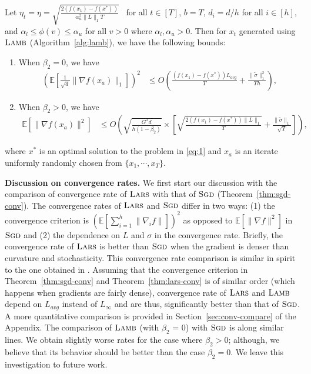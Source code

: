 \begin{theorem}
\label{thm:lamb-conv}
Let $\eta_t = \eta = \sqrt{\tfrac{2(f(x_1) - f(x^*))}{\alpha_u^2 \|L\|_1 T}}$ \ for all $t \in [T]$, $b = T$, $d_i = d/h$ for all $i \in [h]$, and $\alpha_l \leq \phi(v) \leq \alpha_u$ for all $v > 0$ where $\alpha_l, \alpha_u > 0$. Then for $x_t$ generated using $\textsc{Lamb}$ (Algorithm~\ref{alg:lamb}), we have the following bounds:
\begin{enumerate}
    \item When $\beta_2 = 0$, we have
    \begin{align*}
\left(\mathbb{E}\left[\frac{1}{\sqrt{d}}\|\nabla f(x_a)\|_1\right]\right)^2 &\leq  O\left(\frac{(f(x_1) - f(x^*))L_{avg}}{T} + \frac{\|\tilde{\sigma}\|^2_1}{Th}\right),
\end{align*}

    \item When $\beta_2 > 0$, we have
    \begin{align*}
 \mathbb{E}[\|\nabla f(x_a)\|^2] &\leq O\left(\sqrt{\frac{G^2 d}{h(1 - \beta_2)}} \times \left[\sqrt{\frac{2(f(x_1) - f(x^*))\|L\|_1}{T}} + \frac{\|\tilde{\sigma}\|_1}{\sqrt{T}} \right]\right),
\end{align*}

\end{enumerate}
where $x^*$ is an optimal solution to the problem in \eqref{eq:1} and $x_a$ is an iterate uniformly randomly chosen from $\{x_1, \cdots, x_T\}$.
\end{theorem}

{\bf Discussion on convergence rates.} We first start our discussion with the comparison of convergence rate of $\textsc{Lars}$ with that of $\textsc{Sgd}$ (Theorem~\ref{thm:sgd-conv}). The convergence rates of $\textsc{Lars}$ and $\textsc{Sgd}$ differ in two ways: (1) the convergence criterion is $(\mathbb{E}[\sum_{i=1}^h \|\nabla_i f\|])^2$ as opposed to $\mathbb{E}[\|\nabla f\|^2]$ in $\textsc{Sgd}$ and (2) the dependence on $L$ and $\sigma$ in the convergence rate. Briefly, the convergence rate of $\textsc{Lars}$ is better than $\textsc{Sgd}$ when the gradient is denser than curvature and stochasticity. This convergence rate comparison is similar in spirit to the one obtained in \citep{signsgd}. Assuming that the convergence criterion in Theorem~\ref{thm:sgd-conv} and Theorem~\ref{thm:lars-conv} is of similar order (which happens when gradients are fairly dense), convergence rate of $\textsc{Lars}$ and $\textsc{Lamb}$ depend on $L_{avg}$ instead of $L_\infty$ and are thus, significantly better than that of $\textsc{Sgd}$. A more quantitative comparison is provided in Section~\ref{sec:conv-compare} of the Appendix. The comparison of $\textsc{Lamb}$ (with $\beta_2$ = 0) with $\textsc{Sgd}$ is along similar lines. We obtain slightly worse rates for the case where $\beta_2 > 0$; although, we believe that its behavior should be better than the case $\beta_2 = 0$. We leave this investigation to future work. 